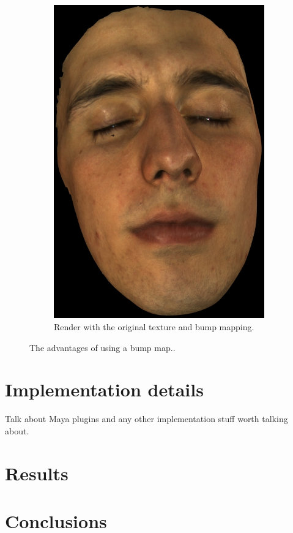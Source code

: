 \documentclass[11pt]{report}
\begin{document}
\begin{figure}
\begin{subfigure}[t]{0.48\textwidth}
                \includegraphics[width=\textwidth]{img/richard_disp_impr}
                \caption{Render with the original texture and bump mapping.}
                \label{fig:richard_disp_impr}
        \end{subfigure}
        \caption{The advantages of using a bump map..}
        \label{fig:bump_mapping_richard}
\end{figure}

\chapter{Implementation details}
\label{sec:implementation_details}

Talk about Maya plugins and any other implementation stuff worth talking about. 

\chapter{Results}


\chapter{Conclusions}


\newpage


\end{document}
